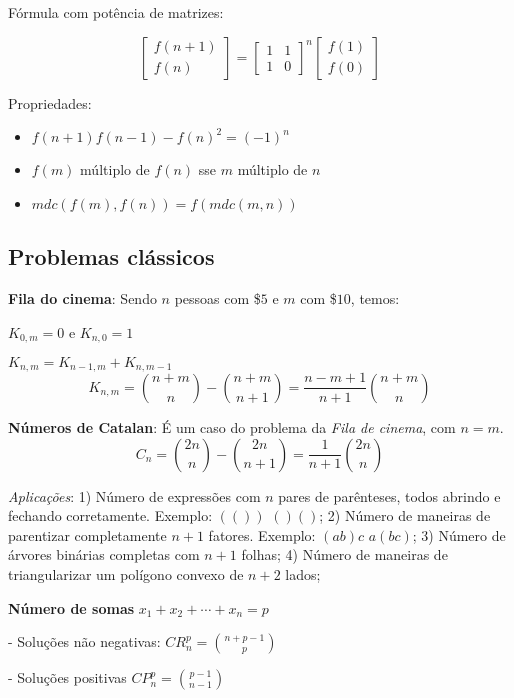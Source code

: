  Fórmula com potência de matrizes:


  $$
  \left[\begin{array}{c}
      f(n+1) \\
      f(n)
    \end{array}\right] =
  \left[\begin{array}{cc}
      1 & 1 \\
      1 & 0
    \end{array}\right]^n
  \left[\begin{array}{c}
      f(1) \\
      f(0)
    \end{array}\right]
  $$

  Propriedades:
  \begin{itemize}
  \item $f(n+1)f(n-1)-f(n)^2=(-1)^n$
  \item $f(m)$ múltiplo de $f(n)$ sse $m$ múltiplo de $n$
  \item $mdc(f(m),f(n))=f(mdc(m,n))$
  \end{itemize}

  \subsection{Problemas clássicos}

  {\bf Fila do cinema}:
  Sendo $n$ pessoas com \$$5$ e $m$ com \$$10$, temos:

  $K_{0,m} = 0$ e $K_{n,0} = 1$

  $K_{n,m} = K_{n-1,m} + K_{n, m-1}$
  $$
  K_{n,m} = {n+m \choose n} - {n+m \choose n+1} = \frac{n - m + 1}{n + 1}{n+m \choose n} 
  $$

  {\bf Números de Catalan}:
  É um caso do problema da \textit{Fila de cinema}, com $n = m$.
  $$
  C_{n} = {2n \choose n} - {2n \choose n+1} = \frac{1}{n + 1}{2n \choose n} 
  $$

  \emph{Aplicações}: 1) Número de expressões com $n$ pares de parênteses, todos abrindo e fechando corretamente. Exemplo: $(())$ $()()$; 2) Número de maneiras de parentizar completamente $n+1$ fatores. Exemplo: $(ab)c$ $a(bc)$; 3) Número de árvores binárias completas com $n+1$ folhas; 4) Número de maneiras de triangularizar um polígono convexo de $n+2$ lados;


  {\bf Número de somas} {\boldmath $x_{1} + x_{2} + \cdots + x_{n} = p$}


  - Soluções não negativas: $CR_{n}^{p} = {n+p-1 \choose p}$
  
  - Soluções positivas $CP_{n}^{p} = {p-1 \choose n-1}$

